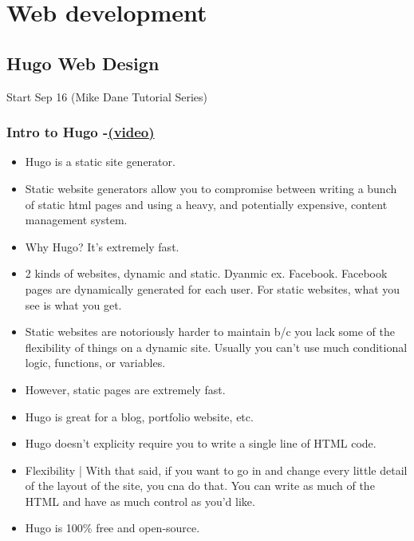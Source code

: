 

\chapter{Web development}


\section{Hugo Web Design}

Start Sep 16 (Mike Dane Tutorial Series)

\subsection{Intro to Hugo -\href{https://youtu.be/qtIqKaDlqXo}{(video)} }
\begin{itemize}
	\item
	Hugo is a static site generator.
	\item
	Static website generators allow you to compromise between writing a bunch of static html pages and using a heavy, and potentially expensive, content management system.
	\item
	Why Hugo? It's extremely fast.
	\item
	2 kinds of websites, dynamic and static. Dyanmic ex. Facebook. Facebook pages are dynamically generated for each user. For static websites, what you see is what you get.
	\item
	Static websites are notoriously harder to maintain b/c you lack some of the flexibility of things  on a dynamic site. Usually you can't use much conditional logic, functions, or variables.
	\item
	However, static pages are extremely fast.
	\item
	Hugo is great for a blog, portfolio website, etc.
	\item
	Hugo doesn't explicity require you to write a single line of HTML code.
	\item
	Flexibility | With that said, if you want to go in and change every little detail of the layout of the site, you cna do that. You can write as much of the HTML and have as much control as you'd like.
	\item
	Hugo is 100\% free and open-source.
\end{itemize}

